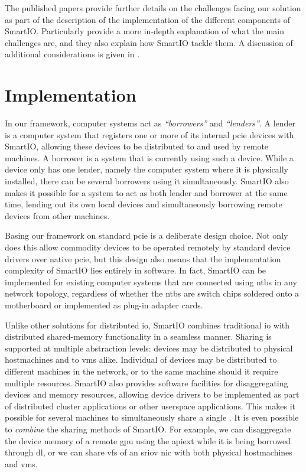 The published papers provide further details on the challenges facing our solution as part of the description of the implementation of the different components of SmartIO.
%
Particularly  provide a more in-depth explanation of what the main challenges are, and they also explain how SmartIO tackle them.
%
A discussion of additional considerations is given in .



\section{Implementation}\label{sec:implementation}
In our framework, computer systems act as \emph{``\glspl{borrower}''} and \emph{``\glspl{lender}''}.
%
A \gls{lender} is a computer system that registers one or more of its internal \gls{pcie} devices with SmartIO, allowing these devices to be distributed to and used by remote machines.
%
A \gls{borrower} is a system that is currently using such a device. 
%
While a device only has one \gls{lender}, namely the computer system where it is physically installed, there can be several \glspl{borrower} using it simultaneously.
%
SmartIO also makes it possible for a system to act as both \gls{lender} and \gls{borrower} at the same time, lending out its own local devices and simultaneously borrowing remote devices from other machines.



Basing our framework on standard \gls{pcie} is a deliberate design choice.
%
Not only does this allow commodity devices to be operated remotely by standard device drivers over native \gls{pcie}, but this design also means that the implementation complexity of SmartIO lies entirely in software.
%
In fact, SmartIO can be implemented for existing computer systems that are connected using \glspl{ntb} in any network topology, regardless of whether the \glspl{ntb} are switch chips soldered onto a motherboard or implemented as plug-in adapter cards.



Unlike other solutions for distributed \gls{io}, SmartIO combines traditional \gls{io} with distributed shared-memory functionality in a seamless manner.
%
Sharing is supported at multiple abstraction levels:
%
devices may be distributed to physical \glspl{hostmachine} and to \glspl{vm} alike.
%
Individual  of  devices may be distributed to different machines in the network, or to the same machine should it require multiple resources.
%
SmartIO also provides software facilities for \gls{disaggregating} devices and memory resources, allowing device drivers to be implemented as part of distributed cluster applications or other \gls{userspace} applications. 
%
This makes it possible for several machines to simultaneously share a single .
%
It is even possible to \emph{combine} the sharing methods of SmartIO. 
%
For example, we can \gls{disaggregate} the device memory of a remote \gls{gpu} using the \gls{apiext} while it is being borrowed through \gls{dl}, or we can share \glspl{vf} of an \gls{sriov} \gls{nic} with both physical \glspl{hostmachine} and \glspl{vm}.


